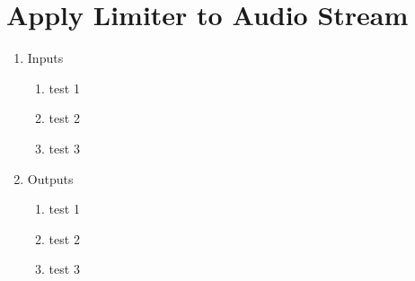 \section{Apply Limiter to Audio Stream}

\begin{enumerate}
	\item Inputs
	\begin{enumerate}
		\item test 1
		\item test 2
		\item test 3
	\end{enumerate}


	\item Outputs
	\begin{enumerate}
		\item test 1
		\item test 2
		\item test 3
	\end{enumerate}	


\end{enumerate}